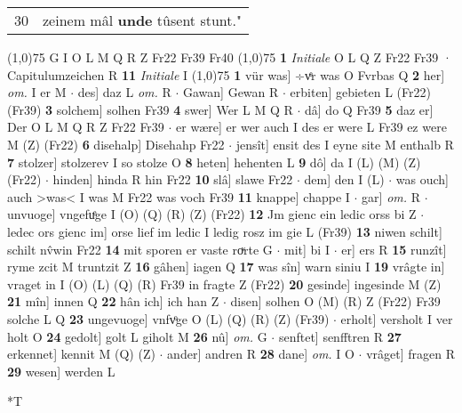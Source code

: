 \documentclass[8pt,a4paper,notitlepage]{article}
\begin{document}
\begin{table}[ht]
\begin{minipage}[t]{0.5\linewidth}
\begin{tabular}{rl}
30 & zeinem mâl \textbf{unde} tûsent stunt."\\ 
\end{tabular}
\scriptsize
\line(1,0){75} \newline
G I O L M Q R Z Fr22 Fr39 Fr40 \newline
\line(1,0){75} \newline
\textbf{1} \textit{Initiale} O L Q Z Fr22 Fr39  · Capitulumzeichen R  \textbf{11} \textit{Initiale} I  \newline
\line(1,0){75} \newline
\textbf{1} vür was] ÷vͤr was O Fvrbas Q \textbf{2} her] \textit{om.} I er M  $\cdot$ des] daz L \textit{om.} R  $\cdot$ Gawan] Gewan R  $\cdot$ erbiten] gebieten L (Fr22) (Fr39) \textbf{3} solchem] solhen Fr39 \textbf{4} swer] Wer L M Q R  $\cdot$ dâ] do Q Fr39 \textbf{5} daz er] Der O L M Q R Z Fr22 Fr39  $\cdot$ er wære] er wer auch I des er were L Fr39 ez were M (Z) (Fr22) \textbf{6} disehalp] Disehahp Fr22  $\cdot$ jensît] ensit des I eyne site M enthalb R \textbf{7} stolzer] stolzerev I so stolze O \textbf{8} heten] hehenten L \textbf{9} dô] da I (L) (M) (Z) (Fr22)  $\cdot$ hinden] hinda R hin Fr22 \textbf{10} slâ] slawe Fr22  $\cdot$ dem] den I (L)  $\cdot$ was ouch] auch >was< I was M Fr22 was voch Fr39 \textbf{11} knappe] chappe I  $\cdot$ gar] \textit{om.} R  $\cdot$ unvuoge] vngefuͤge I (O) (Q) (R) (Z) (Fr22) \textbf{12} Jm gienc ein ledic orss bi Z  $\cdot$ ledec ors gienc im] orse lief im ledic I ledig rosz im gie L (Fr39) \textbf{13} niwen schilt] schilt nv̂win Fr22 \textbf{14} mit sporen er vaste roͮrte G  $\cdot$ mit] bi I  $\cdot$ er] ers R \textbf{15} runzît] ryme zcit M truntzit Z \textbf{16} gâhen] iagen Q \textbf{17} was sîn] warn siniu I \textbf{19} vrâgte in] vraget in I (O) (L) (Q) (R) Fr39 in fragte Z (Fr22) \textbf{20} gesinde] ingesinde M (Z) \textbf{21} mîn] innen Q \textbf{22} hân ich] ich han Z  $\cdot$ disen] solhen O (M) (R) Z (Fr22) Fr39 solche L Q \textbf{23} ungevuoge] vnfvͦge O (L) (Q) (R) (Z) (Fr39)  $\cdot$ erholt] versholt I ver holt O \textbf{24} gedolt] golt L giholt M \textbf{26} nû] \textit{om.} G  $\cdot$ senftet] senfftren R \textbf{27} erkennet] kennit M (Q) (Z)  $\cdot$ ander] andren R \textbf{28} dane] \textit{om.} I O  $\cdot$ vrâget] fragen R \textbf{29} wesen] werden L \newline
\end{minipage}
\hspace{0.5cm}
\begin{minipage}[t]{0.5\linewidth}
\small
\begin{center}*T

\end{center}
\end{minipage}
\end{table}
\end{document}

